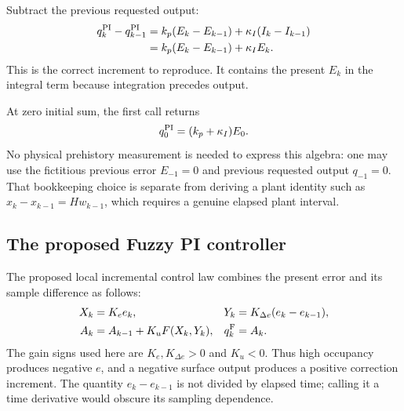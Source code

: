 Subtract the previous requested output:
\begin{align}
 q_k^{\rm PI}-q_{k-1}^{\rm PI}
 &=k_p(E_k-E_{k-1})+\kappa_I(I_k-I_{k-1})\\
 &=k_p(E_k-E_{k-1})+\kappa_I E_k.
 \label{detail:eq:fpi_pi_increment}
\end{align}
This is the correct increment to reproduce. It contains the present
$E_k$ in the integral term because integration precedes output.

At zero initial sum, the first call returns
\begin{equation}
 q_0^{\rm PI}=(k_p+\kappa_I)E_0.
 \label{detail:eq:fpd_first}
\end{equation}
No physical prehistory measurement is needed to express this algebra:
one may use the fictitious previous error $E_{-1}=0$ and previous requested
output $q_{-1}=0$. That bookkeeping choice is separate from deriving a
plant identity such as $x_k-x_{k-1}=H w_{k-1}$, which requires a genuine
elapsed plant interval.

\subsection{The proposed Fuzzy PI controller}

The proposed local incremental control law combines the present error
and its sample difference as follows:
\begin{align}
 X_k&=K_e e_k,&Y_k&=K_{\Delta e}(e_k-e_{k-1}),\\
 A_k&=A_{k-1}+K_uF(X_k,Y_k),&q_k^{\rm F}&=A_k.
 \label{detail:eq:fpi_fuzzy_law}
\end{align}
The gain signs used here are $K_e,K_{\Delta e}>0$ and $K_u<0$. Thus high occupancy
produces negative $e$, and a negative surface output produces a positive
correction increment. The quantity $e_k-e_{k-1}$ is not divided by elapsed
time; calling it a time derivative would obscure its sampling dependence.

